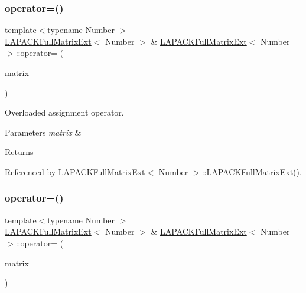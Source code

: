 \subsubsection{\texorpdfstring{operator=()}{operator=()}\hspace{0.1cm}{\footnotesize\ttfamily [1/2]}}
{\footnotesize\ttfamily template$<$typename Number $>$ \\
\hyperlink{classLAPACKFullMatrixExt}{L\+A\+P\+A\+C\+K\+Full\+Matrix\+Ext}$<$ Number $>$ \& \hyperlink{classLAPACKFullMatrixExt}{L\+A\+P\+A\+C\+K\+Full\+Matrix\+Ext}$<$ Number $>$\+::operator= (\begin{DoxyParamCaption}\item[{const \hyperlink{classLAPACKFullMatrixExt}{L\+A\+P\+A\+C\+K\+Full\+Matrix\+Ext}$<$ Number $>$ \&}]{matrix }\end{DoxyParamCaption})}

Overloaded assignment operator. 
\begin{DoxyParams}{Parameters}
{\em matrix} & \\
\hline
\end{DoxyParams}
\begin{DoxyReturn}{Returns}

\end{DoxyReturn}


Referenced by L\+A\+P\+A\+C\+K\+Full\+Matrix\+Ext$<$ Number $>$\+::\+L\+A\+P\+A\+C\+K\+Full\+Matrix\+Ext().

\mbox{\label{classLAPACKFullMatrixExt_ae277e753101db17ebf5bbd43dd04ab27}} 
\subsubsection{\texorpdfstring{operator=()}{operator=()}\hspace{0.1cm}{\footnotesize\ttfamily [2/2]}}
{\footnotesize\ttfamily template$<$typename Number $>$ \\
\hyperlink{classLAPACKFullMatrixExt}{L\+A\+P\+A\+C\+K\+Full\+Matrix\+Ext}$<$ Number $>$ \& \hyperlink{classLAPACKFullMatrixExt}{L\+A\+P\+A\+C\+K\+Full\+Matrix\+Ext}$<$ Number $>$\+::operator= (\begin{DoxyParamCaption}\item[{const L\+A\+P\+A\+C\+K\+Full\+Matrix$<$ Number $>$ \&}]{matrix }\end{DoxyParamCaption})}

